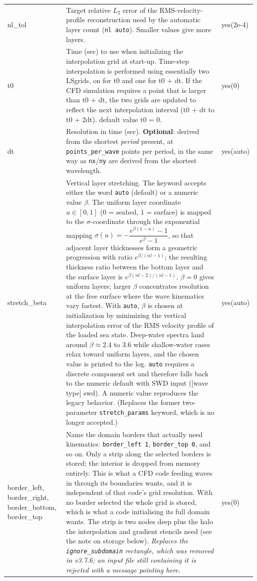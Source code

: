 \begin{xltabular}{\textwidth}{@{}lXl@{}}
nl\_tol&Target relative $L_2$ error of the RMS-velocity-profile reconstruction used by the automatic layer count (\texttt{nl auto}). Smaller values give more layers.&yes(2e-4)\\
t0&Time (sec) to use when initializing the interpolation grid at start-up. Time-step interpolation is performed using essentially two LSgrids, on for t0 and one for t0 + dt. If the CFD simulation requires a point that is larger than t0 + dt, the two grids are updated to reflect the next interpolation interval (t0 + dt to t0 + 2dt). default value t0 = 0.&yes(0)\\
dt&Resolution in time (sec). \textbf{Optional}: derived from the shortest \emph{period} present, at \texttt{points\_per\_wave} points per period, in the same way as \texttt{nx}/\texttt{ny} are derived from the shortest wavelength.&yes(auto)\\
stretch\_beta&Vertical layer stretching. The keyword accepts either the word \texttt{auto} (default) or a numeric value $\beta$. The uniform layer coordinate $u\in[0,1]$ ($0$ = seabed, $1$ = surface) is mapped to the $\sigma$-coordinate through the exponential mapping
$\sigma(u) = -\dfrac{e^{\beta(1-u)}-1}{e^{\beta}-1}$,
so that adjacent layer thicknesses form a geometric progression with ratio $e^{\beta/(nl-1)}$; the resulting thickness ratio between the bottom layer and the surface layer is $e^{\beta(nl-2)/(nl-1)}$. $\beta = 0$ gives uniform layers; larger $\beta$ concentrates resolution at the free surface where the wave kinematics vary fastest. With \texttt{auto}, $\beta$ is chosen at initialization by minimizing the vertical interpolation error of the RMS velocity profile of the loaded sea state. Deep-water spectra land around $\beta \approx 2.4$ to $3.6$ while shallow-water cases relax toward uniform layers, and the chosen value is printed to the log. \texttt{auto} requires a discrete component set and therefore falls back to the numeric default with SWD input ([wave type] swd). A numeric value reproduces the legacy behavior. (Replaces the former two-parameter \texttt{stretch\_params} keyword, which is no longer accepted.)&yes(auto)\\
border\_left, border\_right, border\_bottom, border\_top&Name the domain borders that actually need kinematics: \texttt{border\_left 1}, \texttt{border\_top 0}, and so on. Only a strip along the selected borders is stored; the interior is dropped from memory entirely. This is what a CFD code feeding waves in through its boundaries wants, and it is independent of that code's grid resolution. With no border selected the whole grid is stored, which is what a code initialising its full domain wants. The strip is two nodes deep plus the halo the interpolation and gradient stencils need (see the note on storage below). \emph{Replaces the \texttt{ignore\_subdomain} rectangle, which was removed in v3.7.6; an input file still containing it is rejected with a message pointing here.}&yes(0)\\

\end{xltabular}
